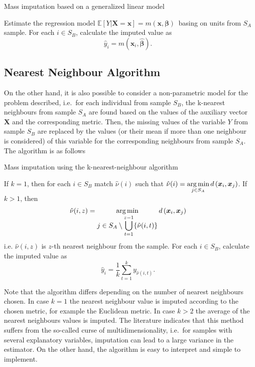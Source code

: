 \documentclass[
]{jss}
\begin{document}
\begin{algorithm}[H]
\caption{Mass imputation based on a generalized linear model}
\label{algo-1}
\begin{algorithmic}[1]
 \State Estimate the regression model $\mathbb{E}[Y|\boldsymbol{X}=\boldsymbol{x}]=m(\boldsymbol{x}, \boldsymbol{\beta})$\ basing on units from $S_A$ sample.
 \State For each $i \in S_B$, calculate the imputed value as
 $$
 \hat{y}_i = m\left(\boldsymbol{x}_{i},\hat{\boldsymbol{\beta}}\right).
 $$
\end{algorithmic}
\end{algorithm}

\hypertarget{nearest-neighbour-algorithm}{%
\subsection{Nearest Neighbour
Algorithm}\label{nearest-neighbour-algorithm}}

On the other hand, it is also possible to consider a non-parametric
model for the problem described, i.e.~for each individual from sample
\(S_B\), the k-nearest neighbours from sample \(S_A\) are found based on
the values of the auxiliary vector \(\boldsymbol{X}\) and the
corresponding metric. Then, the missing values of the variable \(Y\)
from sample \(S_B\) are replaced by the values (or their mean if more
than one neighbour is considered) of this variable for the corresponding
neighbours from sample \(S_A\). The algorithm is as follows

\begin{algorithm}[H]
\caption{Mass imputation using the k-nearest-neighbour algorithm}
\label{algo-2}
\begin{algorithmic}[1]
\State If $k=1$, then for each $i \in S_B$ match $\hat{\nu}(i)$ such that
$\displaystyle \hat{\nu}(i)=
\operatornamewithlimits{arg\,min}_{j\in S_{A}}d\left(\boldsymbol{x}_i,\boldsymbol{x}_j\right)$.
\State If $k>1$, then
$$\hat{\nu}(i, z) = \operatornamewithlimits{arg\,min}_{\displaystyle j\in S_{A}\setminus\bigcup_{t=1}^{z-1}
\{\hat{\nu}(i, t)\}} d\left(\boldsymbol{x}_i, \boldsymbol{x}_j\right)$$
i.e. $\hat{\nu}(i, z)$ is $z$-th nearest neighbour from the sample.\;
\State For each $i \in S_B$, calculate the imputed value as
$$
\hat{y}_i = \frac{1}{k}\sum_{t=1}^{k}y_{\hat{\nu}(i, t)}.
$$
\end{algorithmic}
\end{algorithm}

Note that the algorithm differs depending on the number of nearest
neighbours chosen. In case \(k=1\) the nearest neighbour value is
imputed according to the chosen metric, for example the Euclidean
metric. In case \(k>2\) the average of the nearest neighbours values is
imputed. The literature indicates that this method suffers from the
so-called curse of multidimensionality, i.e.~for samples with several
explanatory variables, imputation can lead to a large variance in the
estimator. On the other hand, the algorithm is easy to interpret and
simple to implement.
\end{document}
